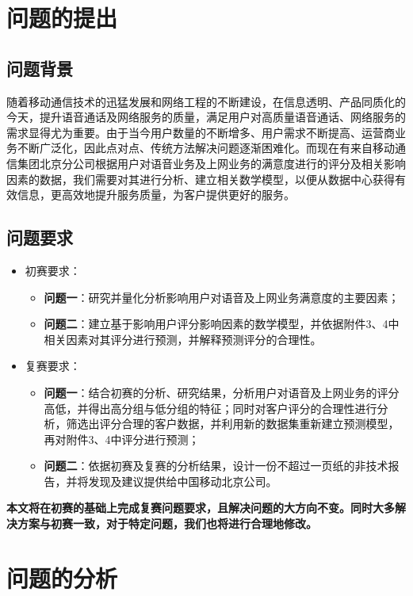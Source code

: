 \documentclass{MathorCupmodeling}
\begin{document}
	\pagestyle{empty}
	\tableofcontents
	\newpage
	\pagestyle{fancy}

	\setcounter{page}{1}
	\section{问题的提出}
	\subsection{问题背景}
	随着移动通信技术的迅猛发展和网络工程的不断建设，在信息透明、产品同质化的今天，提升语音通话及网络服务的质量，满足用户对高质量语音通话、网络服务的需求显得尤为重要。由于当今用户数量的不断增多、用户需求不断提高、运营商业务不断广泛化，因此点对点、传统方法解决问题逐渐困难化。而现在有来自移动通信集团北京分公司根据用户对语音业务及上网业务的满意度进行的评分及相关影响因素的数据，我们需要对其进行分析、建立相关数学模型，以便从数据中心获得有效信息，更高效地提升服务质量，为客户提供更好的服务。
	\subsection{问题要求}
	\begin{itemize}
		\item 初赛要求：
		\begin{itemize}
			\item \textbf{问题一}：研究并量化分析影响用户对语音及上网业务满意度的主要因素；
			\item \textbf{问题二}：建立基于影响用户评分影响因素的数学模型，并依据附件3、4中相关因素对其评分进行预测，并解释预测评分的合理性。
		\end{itemize}
		\item 复赛要求：
		\begin{itemize}
			\item \textbf{问题一}：结合初赛的分析、研究结果，分析用户对语音及上网业务的评分高低，并得出高分组与低分组的特征；同时对客户评分的合理性进行分析，筛选出评分合理的客户数据，并利用新的数据集重新建立预测模型，再对附件3、4中评分进行预测；
			\item \textbf{问题二}：依据初赛及复赛的分析结果，设计一份不超过一页纸的非技术报告，并将发现及建议提供给中国移动北京公司。
		\end{itemize}
	\end{itemize}

	\textbf{本文将在初赛的基础上完成复赛问题要求，且解决问题的大方向不变。同时大多解决方案与初赛一致，对于特定问题，我们也将进行合理地修改。}
	\section{问题的分析}
\end{document}
